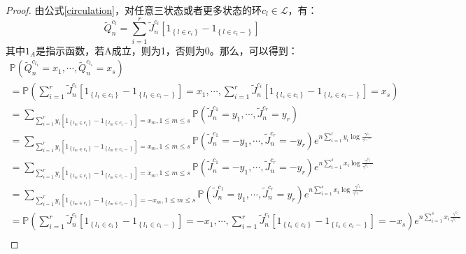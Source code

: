\begin{proof}
    由公式\ref{circulation}，对任意三状态或者更多状态的环$c_l \in \mathcal{L}$，有：
\begin{equation*}
    \tilde{Q}_{n}^{c_{t}}=\sum_{i=1}^{r} \tilde{J}_{n}^{c_{i}}\left[1_{\left\{l \in c_{i}\right\}}-1_{\left\{l \in c_{i}-\right\}}\right]
\end{equation*}
其中$1_A$是指示函数，若A成立，则为1，否则为0。那么，可以得到：
\begin{equation*}
\begin{array}{l}
    \mathbb{P}\left(\tilde{Q}_{n}^{c_{l_{1}}}=x_{1}, \cdots, \tilde{Q}_{n}^{c_{l_{s}}}=x_{s}\right)\\
    =\mathbb{P}\left(\sum_{i=1}^{r} \tilde{J}_{n}^{c_{i}}\left[1_{\left\{l_{1} \in c_{i}\right\}}-1_{\left\{l_{1} \in c_{i}-\right\}}\right]=x_{1}, \cdots, \sum_{i=1}^{r} \tilde{J}_{n}^{c_{i}}\left[1_{\left\{l_{s} \in c_{i}\right\}}-1_{\left\{l_{s} \in c_{i}-\right\}}\right]=x_{s}\right)\\
    =\sum_{\sum_{i=1}^{r} y_{i}\left[1_{\left\{l_{m} \in c_{i}\right\}}-1_{\left\{l_{m} \in c_{i}-\right\}}\right]=x_{m}, 1 \leq m \leq s} \mathbb{P}\left(\tilde{J}_{n}^{c_{1}}=y_{1}, \cdots, \tilde{J}_{n}^{c_{r}}=y_{r}\right)\\
    =\sum_{\sum_{i=1}^{r} y_{i}\left[1_{\left\{l_{m} \in c_{i}\right\}}-1_{\left\{l_{m} \in c_{i}-\right\}}\right]=x_{m}, 1 \leq m \leq s} \mathbb{P}\left(\tilde{J}_{n}^{c_{1}}=-y_{1}, \cdots, \tilde{J}_{n}^{c_{r}}=-y_{r}\right) e^{n \sum_{i=1}^{r} y_{i} \log \frac{\gamma^{c_{i}}}{\gamma^{c_{i}-}}}\\
    =\sum_{\sum_{i=1}^{r} y_{i}\left[1_{\left\{l_{m} \in c_{i}\right\}}-1_{\left\{l_{m} \in c_{i}-\right\}}\right]=x_{m}, 1 \leq m \leq s} \mathbb{P}\left(\tilde{J}_{n}^{c_{1}}=-y_{1}, \cdots, \tilde{J}_{n}^{c_{r}}=-y_{r}\right) e^{n \sum_{i=1}^{s} x_{i} \log \frac{\gamma^{c_{l_i}}}{\gamma^{c_{l_i}-}}}\\
    =\sum_{\sum_{i=1}^{r} y_{i}\left[1_{\left\{l_{m} \in c_{i}\right\}}-1_{\left\{l_{m} \in c_{i}-\right\}}\right]=-x_{m}, 1 \leq m \leq s} \mathbb{P}\left(\tilde{J}_{n}^{c_{1}}=y_{1}, \cdots, \tilde{J}_{n}^{c_{r}}=y_{r}\right) e^{n \sum_{i=1}^{s} x_{i} \log \frac{\gamma^{c_{l_i}}}{\gamma^{c_{l_i}-}}}\\
    =\mathbb{P}\left(\sum_{i=1}^{r} \tilde{J}_{n}^{c_{i}}\left[1_{\left\{l_{1} \in c_{i}\right\}}-1_{\left\{l_{1} \in c_{i}-\right\}}\right]=-x_{1}, \cdots, \sum_{i=1}^{r} \tilde{J}_{n}^{c_{i}}\left[1_{\left\{l_{s} \in c_{i}\right\}}-1_{\left\{l_{s} \in c_{i}-\right\}}\right]=-x_{s}\right) e^{n \sum_{i=1}^{s} x_{i} \frac{\gamma^{c_{l_i}}}{\gamma^{c_{l_i}-}}}\\

\end{array}
\end{equation*}
\end{proof}
